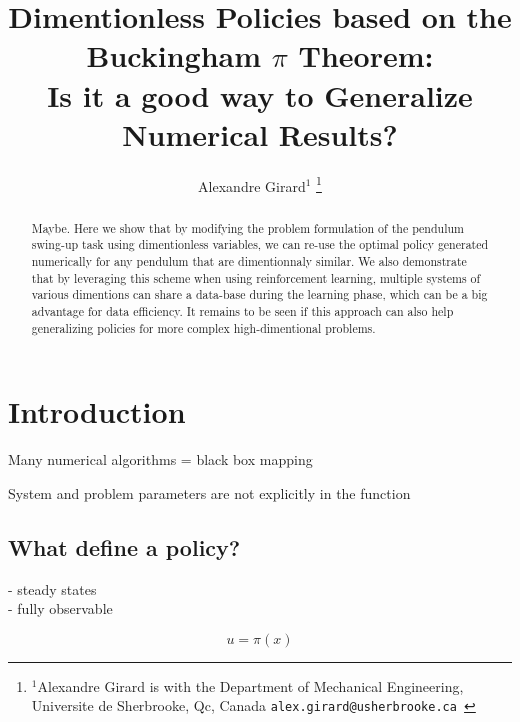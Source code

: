 

\title{\LARGE \bf
Dimentionless Policies based on the Buckingham $\pi$ Theorem: \\ 
Is it a good way to Generalize Numerical Results?
}


\author{Alexandre Girard$^{1}$%
\thanks{$^{1}$Alexandre Girard is with the Department of Mechanical Engineering, Universite de Sherbrooke, Qc, Canada {\tt\small  alex.girard@usherbrooke.ca }}%
}%


\maketitle
\thispagestyle{empty}
\pagestyle{empty}


\begin{abstract}
Maybe. Here we show that by modifying the problem formulation of the pendulum swing-up task using dimentionless variables, we can re-use the optimal policy generated numerically for any pendulum that are dimentionnaly similar. We also demonstrate that by leveraging this scheme when using reinforcement learning, multiple systems of various dimentions can share a data-base during the learning phase, which can be a big advantage for data efficiency. It remains to be seen if this approach can also help generalizing policies for more complex high-dimentional problems.
\end{abstract}

\section{Introduction}

Many numerical algorithms = black box mapping

System and problem parameters are not explicitly in the function




\subsection{What define a policy?}

- steady states \\
- fully observable

\begin{equation}
u
=
\pi \left(
x
\right)
\end{equation}


